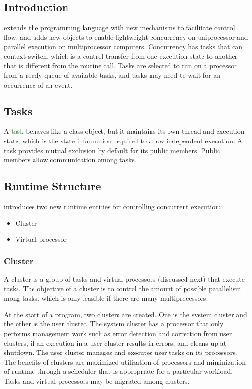 \chapter{\uCPP} \label{uCPP}

\section{Introduction}
\uCPPS \cite{reference10} extends the \CCS programming language with new
mechanisms to
facilitate control flow, and adds new objects to enable lightweight concurrency
on uniprocessor and parallel execution on multiprocessor computers. Concurrency has tasks
that can context switch, which is a control transfer from one execution state to
another that is different from the routine call. Tasks are selected to run on a
processor from a ready queue of available tasks, and tasks may need to wait for an occurrence of an event.

\section{Tasks}
A \textcolor{ForestGreen}{task} behaves like a class object, but it maintains its own
thread and execution state, which is the state information required to allow
independent execution. A task provides mutual exclusion by default for its
public members. Public members allow communication among tasks.

\section{\uCPPS Runtime Structure}
\uCPPS introduces two new runtime entities for controlling concurrent execution:
\begin{itemize}
    \item Cluster
    \item Virtual processor
\end{itemize}

\subsection{Cluster}
A cluster is a group of tasks and virtual processors (discussed next) that
execute tasks. The objective of a cluster is to control the amount of possible
parallelism mong tasks, which is only feasible if there are many
multiprocessors.

At the start of a \uCPPS program, two clusters are created. One is the system
cluster and the other is the user cluster. The system cluster has a
processor that only performs management work such as error detection and
correction from user clusters, if an execution in a user cluster results in errors,
and cleans up at shutdown. The user cluster manages and
executes user tasks on its processors. The benefits of clusters
are maximized utilization of processors and miminization of runtime through a scheduler that is appropriate for a particular workload. Tasks and virtual
processors may be migrated among clusters.


